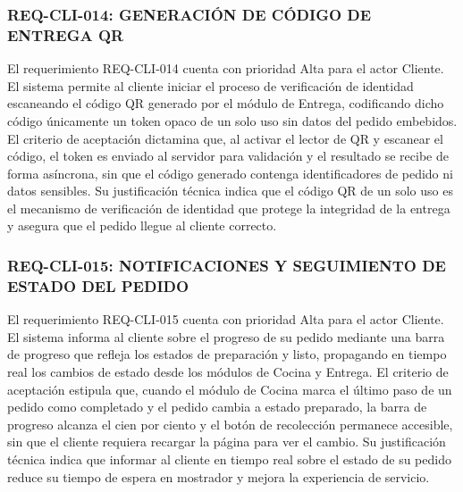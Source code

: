 \subsubsection{REQ-CLI-014: GENERACIÓN DE CÓDIGO DE ENTREGA QR}
El requerimiento REQ-CLI-014 cuenta con prioridad Alta para el actor Cliente. El sistema permite al cliente iniciar el proceso de verificación de identidad escaneando el código QR generado por el módulo de Entrega, codificando dicho código únicamente un token opaco de un solo uso sin datos del pedido embebidos. El criterio de aceptación dictamina que, al activar el lector de QR y escanear el código, el token es enviado al servidor para validación y el resultado se recibe de forma asíncrona, sin que el código generado contenga identificadores de pedido ni datos sensibles. Su justificación técnica indica que el código QR de un solo uso es el mecanismo de verificación de identidad que protege la integridad de la entrega y asegura que el pedido llegue al cliente correcto. 

\subsubsection{REQ-CLI-015: NOTIFICACIONES Y SEGUIMIENTO DE ESTADO DEL PEDIDO}
El requerimiento REQ-CLI-015 cuenta con prioridad Alta para el actor Cliente. El sistema informa al cliente sobre el progreso de su pedido mediante una barra de progreso que refleja los estados de preparación y listo, propagando en tiempo real los cambios de estado desde los módulos de Cocina y Entrega. El criterio de aceptación estipula que, cuando el módulo de Cocina marca el último paso de un pedido como completado y el pedido cambia a estado preparado, la barra de progreso alcanza el cien por ciento y el botón de recolección permanece accesible, sin que el cliente requiera recargar la página para ver el cambio. Su justificación técnica indica que informar al cliente en tiempo real sobre el estado de su pedido reduce su tiempo de espera en mostrador y mejora la experiencia de servicio.

